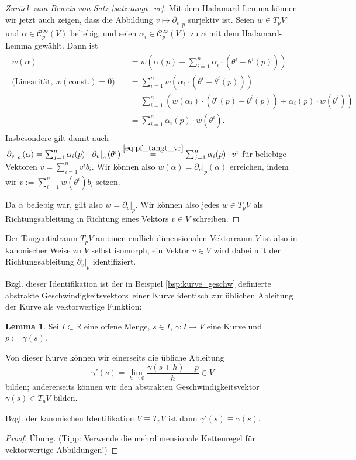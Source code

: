 \documentclass[a4paper]{scrreprt}
\numberwithin{equation}{chapter}
\newcommand{\R}{\mathbb{R}}
\newcommand{\sC}{\mathcal{C}^{\infty}}
\theoremstyle{definition}
\newtheorem{lemma}[defn]{Lemma}
\begin{document}
\begin{proof}[Zurück zum Beweis von Satz \ref{satz:tangt_vr}]
	Mit dem Hadamard-Lemma können wir jetzt auch zeigen, dass die Abbildung $v \mapsto \left.\partial_v\right|_p$ surjektiv ist. Seien $w \in T_pV$ und $\alpha \in \sC_p(V)$ beliebig, und seien $\alpha_i \in \sC_p(V)$ zu $\alpha$ mit dem Hadamard-Lemma gewählt. Dann ist
	\begin{align}\begin{split}
		w(\alpha) &= w\left(\alpha(p) + \sum_{i=1}^n \alpha_i \cdot (\theta^i - \theta^i(p))\right)\\
		\text{(Linearität, $w(\text{const.}) = 0$)} \quad &= \sum_{i=1}^n w(\alpha_i \cdot (\theta^i - \theta^i(p)))\\
		&= \sum_{i=1}^n \left( w(\alpha_i) \cdot (\theta^i(p) - \theta^i(p)) + \alpha_i(p) \cdot w(\theta^i) \right)\\
		&= \sum_{i=1}^n \alpha_i(p) \cdot w(\theta^i).
	\end{split}\end{align}
	Insbesondere gilt damit auch $\left.\partial_v\right|_p (\alpha) = \sum_{j=1}^n \alpha_i(p) \cdot \left.\partial_v\right|_p (\theta^i) \overset{\eqref{eq:pf_tangt_vr}}{=} \sum_{j=1}^n \alpha_i(p) \cdot v^i$ für beliebige Vektoren $v = \sum_{i=1}^n v^i b_i$. Wir können also $w(\alpha) = \left.\partial_v\right|_p (\alpha)$ erreichen, indem wir $v := \sum_{i=1}^n w(\theta^i) b_i$ setzen.

	Da $\alpha$ beliebig war, gilt also $w = \left.\partial_v\right|_p$. Wir können also jedes $w \in T_pV$ als Richtungsableitung in Richtung eines Vektors $v\in V$ schreiben.
\end{proof}

Der Tangentialraum $T_pV$ an einen endlich-dimensionalen Vektorraum $V$ ist also in kanonischer Weise zu $V$ selbst isomorph; ein Vektor $v \in V$ wird dabei mit der Richtungsableitung $\left.\partial_v\right|_p$ identifiziert.

Bzgl. dieser Identifikation ist der in Beispiel \ref{bsp:kurve_geschw} definierte abstrakte \glqq Geschwindigkeitsvektors\grqq\ einer Kurve identisch zur üblichen Ableitung der Kurve als vektorwertige Funktion:
\begin{lemma}
	Sei $I\subset \R$ eine offene Menge, $s\in I$, $\gamma\colon I\to V$ eine Kurve und $p := \gamma(s)$.

	Von dieser Kurve können wir einerseits die übliche Ableitung
	\[\gamma'(s) = \lim_{h\to 0} \frac{\gamma(s+h) - p}{h} \in V\]
	bilden; andererseits können wir den abstrakten Geschwindigkeitsvektor $\dot\gamma(s) \in T_pV$ bilden.

	Bzgl. der kanonischen Identifikation $V \equiv T_pV$ ist dann $\gamma'(s) \equiv \dot\gamma(s)$.

	\begin{proof}
		Übung. (Tipp: Verwende die mehrdimensionale Kettenregel für vektorwertige Abbildungen!)
	\end{proof}
\end{lemma}
\end{document}
